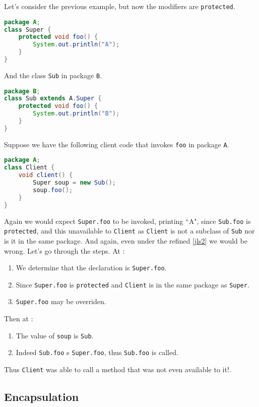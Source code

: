 \documentclass{article}
\begin{document}
\begin{example}
Let's consider the previous example, but now the modifiers are \texttt{protected}.
\begin{lstlisting}[language=Java]
package A;
class Super {
    protected void foo() {
        System.out.println("A");
    }
}
\end{lstlisting}
And the class \texttt{Sub} in package \texttt{B}.
\begin{lstlisting}[language=Java]
package B;
class Sub extends A.Super {
    protected void foo() {
        System.out.println("B");
    }
}
\end{lstlisting}
Suppose we have the following client code that invokes \texttt{foo} in package \texttt{A}.
\begin{lstlisting}[language = Java]
package A;
class Client {
    void client() {
        Super soup = new Sub();
        soup.foo();
    }
}
\end{lstlisting}
Again we would expect \texttt{Super.foo} to be invoked, printing ``A", since \texttt{Sub.foo} is \texttt{protected}, and this unavailable to \texttt{Client} as \texttt{Client} is not a subclass of \texttt{Sub} nor is it in the same package.
And again, even under the refined \ref{jls2} we would be wrong.
Let's go through the steps.
At \compiletime{}:
\begin{enumerate}
\item We determine that the \static{} declaration is \texttt{Super.foo}.
\item Since \texttt{Super.foo} is \texttt{protected} and \texttt{Client} is in the same package as \texttt{Super}.
\item \texttt{Super.foo} may be overriden.
\end{enumerate}
Then at \runtime{}:
\begin{enumerate}
\item The \dynamic{} value of \texttt{soup} is \texttt{Sub}.
\item Indeed \texttt{Sub.foo} \override{}s \texttt{Super.foo}, thus \texttt{Sub.foo} is called.
\end{enumerate}
Thus \texttt{Client} was able to call a method that was not even available to it!.
\end{example}

\subsection{Encapsulation}
\end{document}
